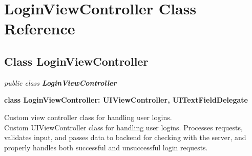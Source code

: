 
\hypertarget{class_LoginViewController.iOS}{\section{LoginViewController Class Reference}
\label{class_LoginViewController.iOS}
}

\subsection*{Class LoginViewController}

\textit{public class \textbf{LoginViewController}}

\tab \textbf{class LoginViewController: UIViewController, UITextFieldDelegate}

Custom view controller class for handling user logins.\\

Custom UIViewController class for handling user logins. Processes requests, validates input, and passes data to backend for checking with the server, and properly handles both successful and unsuccessful login requests.\\

